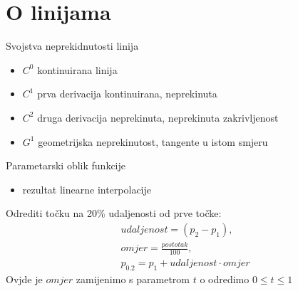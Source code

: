 \documentclass[9pt]{beamer}
\begin{document}
\section{O linijama}
\begin{frame}{Svojstva neprekidnutosti linija}
	\begin{itemize}
		\item<1-> $C^{0}$ kontinuirana linija
		\item<2-> $C^{1}$ prva derivacija kontinuirana, neprekinuta
		\item<3-> $C^{2}$ druga derivacija neprekinuta, neprekinuta zakrivljenost
		\item<4-> $G^{1}$ geometrijska neprekinutost, tangente u istom smjeru
	\end{itemize}
	\begin{center}
	\end{center}
\end{frame}
\begin{frame}{Parametarski oblik funkcije}
	\begin{itemize}
		\item rezultat linearne interpolacije
	\end{itemize}
	Odrediti točku na 20\% udaljenosti od prve točke:
	\begin{align*}
		udaljenost = (p_{2} - p_{1}), \\
		omjer = \frac{postotak}{100}, \\
		p_{0.2} = p_{1} + udaljenost \cdot omjer
	\end{align*}
	Ovjde je $omjer$ zamijenimo s parametrom $t$ o odredimo $0 \leq t \leq 1$
	
\end{frame}
\end{document}
